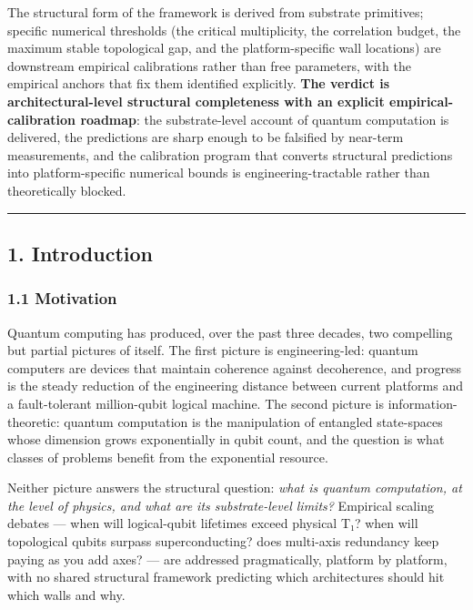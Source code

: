 \documentclass[
  11pt,
  a4paper,
]{article}
\begin{document}
The structural form of the framework is derived from substrate
primitives; specific numerical thresholds (the critical multiplicity,
the correlation budget, the maximum stable topological gap, and the
platform-specific wall locations) are downstream empirical calibrations
rather than free parameters, with the empirical anchors that fix them
identified explicitly. \textbf{The verdict is architectural-level
structural completeness with an explicit empirical-calibration roadmap}:
the substrate-level account of quantum computation is delivered, the
predictions are sharp enough to be falsified by near-term measurements,
and the calibration program that converts structural predictions into
platform-specific numerical bounds is engineering-tractable rather than
theoretically blocked.

\begin{center}\rule{0.5\linewidth}{0.5pt}\end{center}

\subsection{1. Introduction}\label{introduction}

\subsubsection{1.1 Motivation}\label{motivation}

Quantum computing has produced, over the past three decades, two
compelling but partial pictures of itself. The first picture is
engineering-led: quantum computers are devices that maintain coherence
against decoherence, and progress is the steady reduction of the
engineering distance between current platforms and a fault-tolerant
million-qubit logical machine. The second picture is
information-theoretic: quantum computation is the manipulation of
entangled state-spaces whose dimension grows exponentially in qubit
count, and the question is what classes of problems benefit from the
exponential resource.

Neither picture answers the structural question: \emph{what is quantum
computation, at the level of physics, and what are its substrate-level
limits?} Empirical scaling debates --- when will logical-qubit lifetimes
exceed physical T₁? when will topological qubits surpass
superconducting? does multi-axis redundancy keep paying as you add axes?
--- are addressed pragmatically, platform by platform, with no shared
structural framework predicting which architectures should hit which
walls and why.
\end{document}
